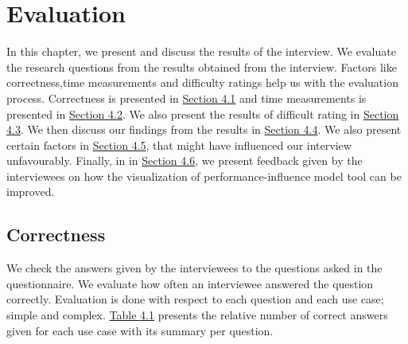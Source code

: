 \chapter{Evaluation}
\label{evaluation}

In this chapter, we present and discuss the results of the interview. We evaluate the research questions from the results obtained from the interview. Factors like correctness,time measurements and difficulty ratings help us with the evaluation process. Correctness is presented in \hyperref[sec:4.1]{Section 4.1} and time measurements is presented in \hyperref[sec:4.2]{Section 4.2}. We also present the results of difficult rating in \hyperref[sec:4.3]{Section 4.3}. We then discuss our findings from the results in \hyperref[sec:4.4]{Section 4.4}. We also present certain factors in \hyperref[sec:4.5]{Section 4.5}, that might have influenced our interview unfavourably. Finally, in in \hyperref[sec:4.6]{Section 4.6}, we present feedback given by the interviewees on how the visualization of performance-influence model tool can be improved. 

\section{Correctness}
\label{sec:4.1}
We check the answers given by the interviewees to the questions asked in the questionnaire. We evaluate how often an interviewee answered the question correctly. Evaluation is done with respect to each question and each use case; simple and complex. \hyperref[table:correctness]{Table 4.1} presents the relative number of correct answers given for each use  case with its summary per question. 
 
